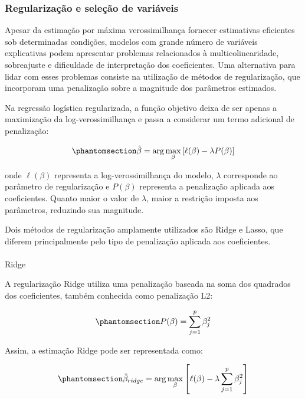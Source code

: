 \documentclass[
  brazilian,
  12pt,
  letterpaper,
  DIV=11,
  numbers=noendperiod]{scrartcl}
\makeatletter
\let\oldparagraph\paragraph
\renewcommand{\paragraph}{
    \@ifstar
      \xxxParagraphStar
      \xxxParagraphNoStar
  }
\newcommand{\xxxParagraphStar}[1]{\oldparagraph*{#1}\mbox{}}
\newcommand{\xxxParagraphNoStar}[1]{\oldparagraph{#1}\mbox{}}
\makeatother
\begin{document}
\subsubsection{Regularização e seleção de
variáveis}\label{regularizauxe7uxe3o-e-seleuxe7uxe3o-de-variuxe1veis}

Apesar da estimação por máxima verossimilhança fornecer estimativas
eficientes sob determinadas condições, modelos com grande número de
variáveis explicativas podem apresentar problemas relacionados à
multicolinearidade, sobreajuste e dificuldade de interpretação dos
coeficientes. Uma alternativa para lidar com esses problemas consiste na
utilização de métodos de regularização, que incorporam uma penalização
sobre a magnitude dos parâmetros estimados.

Na regressão logística regularizada, a função objetivo deixa de ser
apenas a maximização da log-verossimilhança e passa a considerar um
termo adicional de penalização:

\begin{equation}\protect\phantomsection\label{eq-regularizacao-geral}{
\hat{\beta}
=
\arg\max_{\beta}
\left[
\ell(\beta)-\lambda P(\beta)
\right]
}\end{equation}

onde \(\ell(\beta)\) representa a log-verossimilhança do modelo,
\(\lambda\) corresponde ao parâmetro de regularização e \(P(\beta)\)
representa a penalização aplicada aos coeficientes. Quanto maior o valor
de \(\lambda\), maior a restrição imposta aos parâmetros, reduzindo sua
magnitude.

Dois métodos de regularização amplamente utilizados são Ridge e Lasso,
que diferem principalmente pelo tipo de penalização aplicada aos
coeficientes.

\paragraph{Ridge}\label{ridge}

A regularização Ridge utiliza uma penalização baseada na soma dos
quadrados dos coeficientes, também conhecida como penalização L2:

\begin{equation}\protect\phantomsection\label{eq-ridge-penalty}{
P(\beta)=\sum_{j=1}^{p}\beta_j^2
}\end{equation}

Assim, a estimação Ridge pode ser representada como:

\begin{equation}\protect\phantomsection\label{eq-ridge}{
\hat{\beta}_{ridge}
=
\arg\max_{\beta}
\left[
\ell(\beta)
-
\lambda
\sum_{j=1}^{p}\beta_j^2
\right]
}\end{equation}
\end{document}
